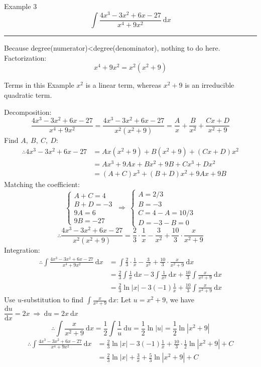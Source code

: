 \documentclass[12pt,a4paper]{article}
\def\d{{\mathrm{d}}}
\begin{document}
\begin{eg}{Example 3}
	$$\int\frac{4x^3-3x^2+6x-27}{x^4+9x^2}\ \d x$$
	\noindent\rule[0.25\baselineskip]{\textwidth}{1pt}
	Because degree(numerator)<degree(denominator), nothing to do here.\\
	Factorization: 
	$$x^4+9x^2=x^2(x^2+9)$$
	\begin{rmk}{Terms in this Example}
		$x^2$ is a linear term, whereas $x^2+9$ is an irreducible quadratic term. 
	\end{rmk}
	Decomposition: 
	$$\frac{4x^3-3x^2+6x-27}{x^4+9x^2}=\frac{4x^3-3x^2+6x-27}{x^2(x^2+9)}=\frac{A}{x}+\frac{B}{x^2}+\frac{Cx+D}{x^2+9}$$
	Find $A,\ B,\ C,\ D$: 
	$$\begin{aligned}
		\therefore 4x^3-3x^2+6x-27&=Ax(x^2+9)+B(x^2+9)+(Cx+D)x^2\\
		&=Ax^3+9Ax+Bx^2+9B+Cx^3+Dx^2\\
		&=(A+C)x^3+(B+D)x^2+9Ax+9B
	\end{aligned}$$
	Matching the coefficient: 
	$$\begin{cases}
		A+C=4\\
		B+D=-3\\
		9A=6\\
		9B=-27
	\end{cases}\ \Rightarrow\ \begin{cases}
		A=2/3\\
		B=-3\\
		C=4-A=10/3\\
		D=-3-B=0
	\end{cases}$$
	$$\therefore\frac{4x^3-3x^2+6x-27}{x^2(x^2+9)}=\frac{2}{3}\cdot\frac{1}{x}-\frac{3}{x^2}+\frac{10}{3}\cdot\frac{x}{x^2+9}$$
	Integration: 
	$$\begin{aligned}
		\therefore\int\frac{4x^3-3x^2+6x-27}{x^4+9x^2}\ \d x&=\int\frac{2}{3}\cdot\frac{1}{x}-\frac{3}{x^2}+\frac{10}{3}\cdot\frac{x}{x^2+9}\ \d x\\
		&=\frac{2}{3}\int\frac{1}{x}\ \d x-3\int\frac{1}{x^2}\ \d x+\frac{10}{3}\int\frac{x}{x^2+9}\ \d x\\
		&=\frac{2}{3}\ln|x|-3(-1)\frac{1}{x}+\frac{10}{3}\int\frac{x}{x^2+9}\ \d x
	\end{aligned}$$
	Use $u$-substitution to find $\displaystyle\int\frac{x}{x^2+9}\ \d x$: Let $u=x^2+9$, we have $\dfrac{\d u}{\d x}=2x\ \Rightarrow\ \d u=2x\ \d x$
	$$\therefore\int\frac{x}{x^2+9}\ \d x=\frac{1}{2}\int\frac{1}{u}\ \d u=\frac{1}{2}\ln|u|=\frac{1}{2}\ln|x^2+9|$$
	$$\begin{aligned}
		\therefore\int\frac{4x^3-3x^2+6x-27}{x^4+9x^2}\ \d x&=\frac{2}{3}\ln|x|-3(-1)\frac{1}{x}+\frac{10}{3}\cdot\frac{1}{2}\ln|x^2+9|+C\\
		&=\frac{2}{3}\ln|x|+\frac{3}{x}+\frac{5}{3}\ln|x^2+9|+C
	\end{aligned}$$
\end{eg}
\end{document}
